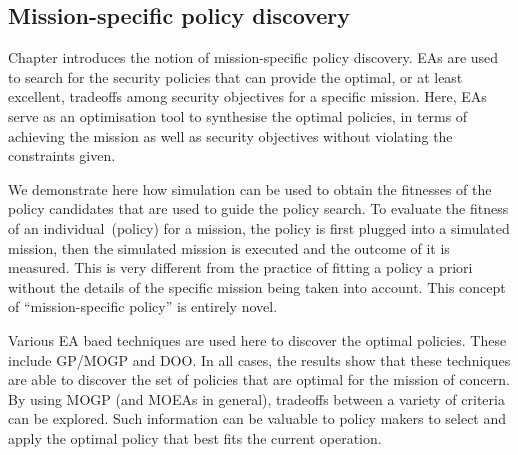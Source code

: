 \subsection{Mission-specific policy discovery}
\label{Evaluation.MissionSpecificPolicyDiscovery}
Chapter introduces the notion of
mission-specific policy discovery. EAs are used to search for the
security policies that can provide the optimal, or at least excellent,
tradeoffs among security objectives for a specific mission. Here, EAs
serve as an optimisation tool to synthesise the optimal policies, in
terms of achieving the mission as well as security objectives without
violating the constraints given.

We demonstrate here how simulation can be used to obtain the fitnesses
of the policy candidates that are used to guide the policy search. To
evaluate the fitness of an individual~(policy) for a mission, the
policy is first plugged into a simulated mission, then the simulated
mission is executed and the outcome of it is measured. This is very
different from the practice of fitting a policy a priori without the
details of the specific mission being taken into account. This concept
of ``mission-specific policy'' is entirely novel.

Various EA baed techniques are used here to discover the optimal
policies. These include GP/MOGP and DOO. In all cases, the results
show that these techniques are able to discover the set of policies
that are optimal for the mission of concern. By using MOGP (and MOEAs
in general), tradeoffs between a variety of criteria can be
explored. Such information can be valuable to policy makers to select
and apply the optimal policy that best fits the current operation.

